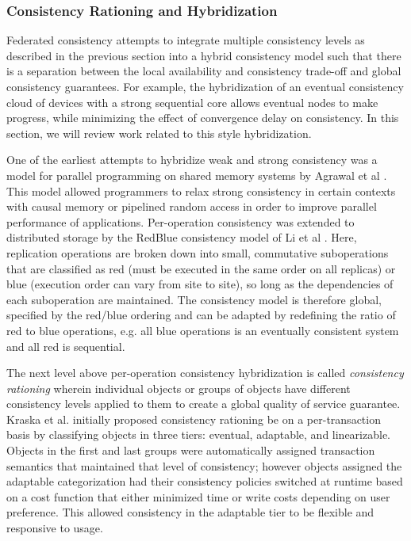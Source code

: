\documentclass{article}
\begin{document}
\subsubsection{Consistency Rationing and Hybridization}
\label{sec:hybridization}

Federated consistency attempts to integrate multiple consistency levels as described in the previous section into a hybrid consistency model such that there is a separation between the local availability and consistency trade-off and global consistency guarantees. For example, the hybridization of an eventual consistency cloud of devices with a strong sequential core allows eventual nodes to make progress, while minimizing the effect of convergence delay on consistency. In this section, we will review work related to this style hybridization.

One of the earliest attempts to hybridize weak and strong consistency was a model for parallel programming on shared memory systems by Agrawal et al \cite{agrawal_mixed_1994}. This model allowed programmers to relax strong consistency in certain contexts with causal memory or pipelined random access in order to improve parallel performance of applications. Per-operation consistency was extended to distributed storage by the RedBlue consistency model of Li et al \cite{li_making_2012}. Here, replication operations are broken down into small, commutative suboperations that are classified as red (must be executed in the same order on all replicas) or blue (execution order can vary from site to site), so long as the dependencies of each suboperation are maintained. The consistency model is therefore global, specified by the red/blue ordering and can be adapted by redefining the ratio of red to blue operations, e.g. all blue operations is an eventually consistent system and all red is sequential.

The next level above per-operation consistency hybridization is called \textit{consistency rationing} wherein individual objects or groups of objects have different consistency levels applied to them to create a global quality of service guarantee. Kraska et al. \cite{kraska_consistency_2009} initially proposed consistency rationing be on a per-transaction basis by classifying objects in three tiers: eventual, adaptable, and linearizable. Objects in the first and last groups were automatically assigned transaction semantics that maintained that level of consistency; however objects assigned the adaptable categorization had their consistency policies switched at runtime based on a cost function that either minimized time or write costs depending on user preference. This allowed consistency in the adaptable tier to be flexible and responsive to usage.
\end{document}
